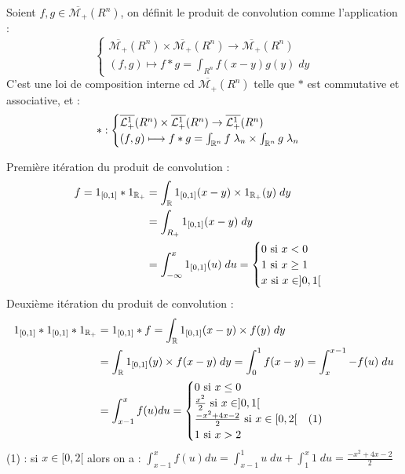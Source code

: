 \begin{definition}
    Soient $f,g \in \overline{\mathcal{M}_+}(R^n)$, on définit le produit de convolution comme l'application :
        \[ \boxed{
            \begin{cases}
                \overline{\mathcal{M}_+}(R^n) \times \overline{\mathcal{M}_+}(R^n) \rightarrow \overline{\mathcal{M}_+}(R^n) \\ 
                (f,g) \longmapsto f \ast g = \int_{R^n} f(x-y)g(y) \; dy
            \end{cases}}
        \]
    C'est une loi de composition interne cd $\overline{\mathcal{M}_+}(R^n)$ telle que $\ast$ est commutative et associative, et :
        \[ \ast : 
            \begin{cases}
                \overline{\mathcal{L}_+^1}(R^n) \times \overline{\mathcal{L}_+^1}(R^n) \rightarrow \overline{\mathcal{L}_+^1}(R^n) \\ 
                (f,g) \longmapsto f \ast g = \int_{\mathbb{R}^n} f\; \lambda_n \times \int_{\mathbb{R}^n} g\; \lambda_n 
            \end{cases}
        \] 
\end{definition}

\begin{example}
    Première itération du produit de convolution :
    \begin{align*}
        f = 1_{[0,1]} \ast 1_{\mathbb{R}_+} &= \int_{\mathbb{R}} 1_{[0,1]}(x-y) \times 1_{\mathbb{R}_+}(y) \; dy \\
        &= \int_{R_+} 1_{[0,1]}(x-y) \; dy  \\ 
          &= \int_{- \infty}^{x} 1_{[0,1]}(u) \; du = 
          \begin{cases}
            0 \text{ si } x < 0 \\ 
            1 \text{ si } x \geq 1 \\ 
            x \text{ si } x \in ]0,1[ 
          \end{cases}
    \end{align*}
    Deuxième itération du produit de convolution :
    \begin{align*}
        1_{[0,1]} \ast 1_{[0,1]} \ast 1_{\mathbb{R}_+} &= 1_{[0,1]} \ast f = \int_{\mathbb{R}} 1_{[0,1]}(x-y) \times f(y) \; dy \\ 
        &= \int_{\mathbb{R}} 1_{[0,1]}(y) \times f(x-y) \; dy = \int_{0}^{1} f(x-y) = \int_{x}^{x-1} -f(u) \; du \\
        &= \int_{x-1}^{x} f(u) du =
        \begin{cases}
            0 \text{ si } x \leq 0 \\
            \frac{x^2}{2} \text{ si } x \in ]0,1[ \\ 
            \frac{-x^2 + 4x -2}{2} \text{ si } x \in [0,2[ \quad (1)\\ 
            1 \text{ si } x > 2
        \end{cases} 
    \end{align*}
    (1) : si  $x \in [0,2[$ alors on a : $\int_{x-1}^{x} f(u) du = \int_{x-1}^{1} u \; du + \int_{1}^{x} 1 \; du =  \frac{-x^2 + 4x -2}{2} $
\end{example}


